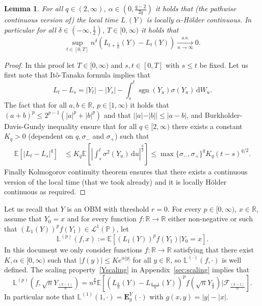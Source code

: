 \documentclass[12pt]{article}
\numberwithin{equation}{section}
\newtheorem{lemma}{Lemma}
\theoremstyle{definition}
\theoremstyle{remark}
\newcommand{\convas}[1][]{\xrightarrow[#1]{\mathrm{a.s.}}}
\newcommand{\RR}{\mathbb{R}}
\newcommand{\PP}{\mathbb{P}}
\newcommand{\EE}{\mathbb{E}}
\newcommand{\cF}{\mathcal{F}}
\newcommand{\vd}{\,\mathrm{d}}
\newcommand{\Lone}{\mathcal{L}^1}
\newcommand{\bfH}[1]{\mathbf{E}^Y_{#1}}
\newcommand{\Lm}[3]{\mathbb{L}^{(#2)}(#1,#3)}
\DeclareMathOperator{\sgn}{sgn}
\begin{document}
\begin{lemma} \label{lem:holderL}
For all $q\in (2,\infty)$, $\alpha \in (0,\frac{q-2}{2 q})$ 
it holds that (the pathwise continuous version of) the local time $L_\cdot(Y)$ is locally $\alpha$-H\"older continuous.
In particular for all $\delta \in (-\infty,\frac12)$, $T\in [0,\infty)$ it holds that
\begin{equation} 
	\sup_{t\in [0,T]} n^{\delta} \left(L_{ t +\frac1n }(Y) - L_t(Y)\right) \convas[n\to\infty] 0.\end{equation}
\end{lemma}
\begin{proof}
In this proof let $T\in [0,\infty)$ and $s,t \in [0,T]$ with $s\leq t$ be fixed.
Let us first note that It\^o-Tanaka formula 
implies that 
\[L_t -L_s = |Y_t|-|Y_s| -\int_s^t \sgn(Y_u) \sigma(Y_u) \vd W_u.\]
The fact that for all $a,b\in \RR$, $p\in [1,\infty)$ it holds that $(a+b)^p \leq 2^{p-1}(|a|^p + |b|^p)$ and that $||a|-|b|| \leq |a-b|$,
and Burkholder-Davis-Gundy inequality ensure that for all $q\in [2,\infty)$ there exists a constant $K_q>0$ (dependent on $q,\sigma_-$ and $\sigma_+$) such that
\begin{equation}
\begin{split}
	\EE\!\left[|L_t -L_s|^q\right] 
	& \leq K_q \EE\!\left[ \left| \int_s^t \sigma^2(Y_u) \vd u \right|^{\frac{q}2} \right]
	\leq 
	\max{\{\sigma_-,\sigma_+\}}^q 
	K_q (t-s)^{q/2}.
\end{split}
\end{equation}
Finally Kolmogorov continuity theorem ensures that there exists a continuous version of the local time (that we took already) and it is locally H\"older continuous as required. 
\end{proof}




Let us recall that $Y$ is an OBM with threshold $r=0$.
For every $p\in [0,\infty)$, $x\in \RR$, assume that $Y_0=x$ and for every function $f\colon\RR\to\RR$ either non-negative or such that $\left( L_1(Y)\right)^p f(Y_1)\in \Lone(\PP)$,
let 
\begin{equation} \label{function:G}
	\Lm{f}{p}{x} := \EE\!\left[ \left( L_1(Y)\right)^p f(Y_1) | Y_0=x \right] \!.
\end{equation}
In this document we only consider functions $f\colon \RR \to \RR$ satisfying that there exist $K,\alpha\in [0,\infty)$ such that $|f(y)|\leq K e^{\alpha |y|}$ for all $y\in \RR$, so $\Lm{f}{\cdot}{\cdot}$ is well defined. 
%
The scaling property~\eqref{Yscaling} in Appendix~\ref{sec:scaling} implies that 
\begin{equation} \label{function:G:equal}
	\Lm{f}{p}{\sqrt{n} Y_{\frac{(k-1)}{n}}}= n^{\frac{p}2} \EE\!\left[ \left( L_{\frac{k}n}(Y) -  L_{\frac{k-1}n}(Y) \right)^p f(\sqrt{n} Y_{\frac{k}{n}}) | \cF_{\frac{(k-1)}{n}}\right]
\!.
\end{equation}
In particular note that $\Lm{1}{1}{\cdot} = \bfH{g}(\cdot)$ with $g(x,y)=|y|-|x|$.
\end{document}
